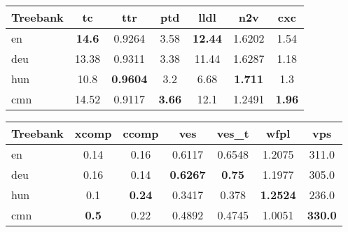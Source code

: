 \begin{table*}
\centering
\begin{tabularx}{\textwidth}{Xcccccc}
\hline
\textbf{Treebank} & \textbf{tc} & \textbf{ttr} & \textbf{ptd} & \textbf{lldl} & \textbf{n2v} & \textbf{cxc} \\
\hline
en & \textbf{14.6} & 0.9264 & 3.58 & \textbf{12.44} & 1.6202 & 1.54 \\
\hline
deu & 13.38 & 0.9311 & 3.38 & 11.44 & 1.6287 & 1.18 \\
\hline
hun & 10.8 & \textbf{0.9604} & 3.2 & 6.68 & \textbf{1.711} & 1.3 \\
\hline
cmn & 14.52 & 0.9117 & \textbf{3.66} & 12.1 & 1.2491 & \textbf{1.96} \\
\hline
\end{tabularx}

\vspace{0.5cm}

\begin{tabularx}{\textwidth}{Xcccccc}
\hline
\textbf{Treebank} & \textbf{xcomp} & \textbf{ccomp} & \textbf{ves} & \textbf{ves\_t} & \textbf{wfpl} & \textbf{vps} \\
\hline
en & 0.14 & 0.16 & 0.6117 & 0.6548 & 1.2075 & 311.0 \\
\hline
deu & 0.16 & 0.14 & \textbf{0.6267} & \textbf{0.75} & 1.1977 & 305.0 \\
\hline
hun & 0.1 & \textbf{0.24} & 0.3417 & 0.378 & \textbf{1.2524} & 236.0 \\
\hline
cmn & \textbf{0.5} & 0.22 & 0.4892 & 0.4745 & 1.0051 & \textbf{330.0} \\
\hline
\end{tabularx}
\caption{Results on in-house parallel treebank. Top values are highlighted for each metric.}
\label{tab:results-ours}
\end{table*}